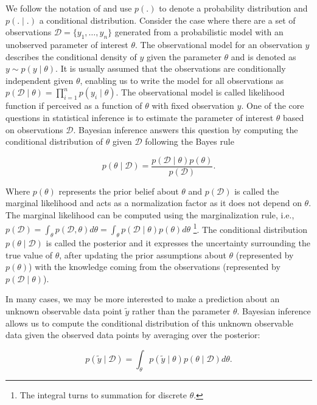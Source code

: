 \documentclass[dissertation,math,vertlayout,pdfa,colorlinks]{aaltoseries}
\newcommand{\bD}{\mathcal{D}}
\begin{document}
We follow the notation of \cite{Gelman2013} and use $p(.)$ to denote a probability distribution and $p(.\mid.)$ a conditional distribution. Consider the case where there are a set of observations $\bD= \{y_1,\ldots,y_n\}$ generated from a probabilistic model with an unobserved parameter of interest $\theta$. The observational model for an observation $y$ describes the conditional density of $y$ given the parameter $\theta$ and is denoted as $y \sim p(y \mid \theta)$. It is usually assumed that the observations are conditionally independent given $\theta$, enabling us to write the model for all observations as $p(\bD \mid \theta) =  \prod_{i=1}^{n} p(y_i \mid \theta)$. The observational model is called likelihood function if perceived as a function of $\theta$ with fixed observation $y$. One of the core questions in statistical inference is to estimate the parameter of interest $\theta$ based on observations $\bD$. %
Bayesian inference answers this question by computing the conditional distribution of $\theta$ given $\bD$ following the Bayes rule


\begin{equation}\label{Eq:Bayes}
p(\theta \mid \bD) = \frac{p(\bD \mid \theta)p(\theta)}{p(\bD)}.
\end{equation}  

Where $p(\theta)$ represents the prior belief about $\theta$ and $p(\bD)$ is called the marginal likelihood and acts as a normalization factor as it does not depend on $\theta$. The marginal likelihood can be computed using the marginalization rule, i.e., $p(\bD)= \int_{\theta} p(\bD, \theta)d\theta= \int_{\theta} p(\bD \mid \theta)p(\theta) d\theta$ \footnote{The integral turns to summation for discrete $\theta$.}. The conditional distribution $p(\theta \mid \bD)$ is called the posterior and it expresses the uncertainty surrounding the true value of $\theta$, after updating the prior assumptions about $\theta$ (represented by $p(\theta)$) with the knowledge coming from the observations (represented by $p(\bD \mid \theta)$).  

In many cases, we may be more interested to make a prediction about an unknown observable data point $\tilde{y}$ rather than the parameter $\theta$. Bayesian inference allows us to compute the conditional distribution of this unknown observable data given the observed data points by averaging over the posterior: 

\begin{equation}
p(\tilde{y} \mid\bD ) = \int_{\theta} p(\tilde{y}  \mid \theta)p(\theta \mid \bD)d\theta. 
\end{equation}
\end{document}
